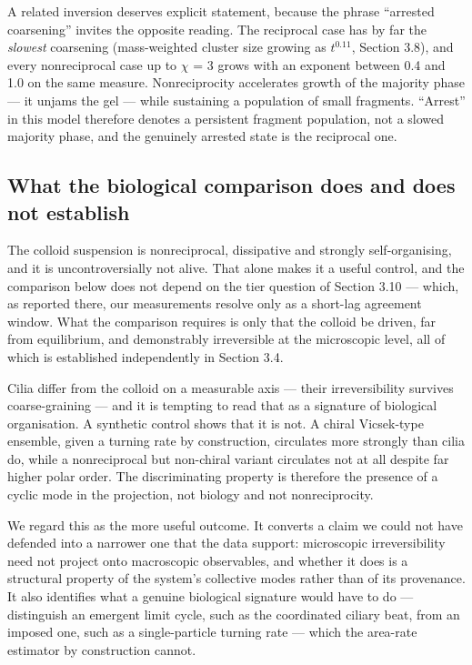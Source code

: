 \documentclass[aps,pre,preprint,superscriptaddress,nofootinbib,longbibliography]{revtex4-2}
\begin{document}
A related inversion deserves explicit statement, because the phrase ``arrested coarsening'' invites the opposite reading. The reciprocal case has by far the \emph{slowest} coarsening (mass-weighted cluster size growing as $t^{0.11}$, Section 3.8), and every nonreciprocal case up to $\chi$ = 3 grows with an exponent between 0.4 and 1.0 on the same measure. Nonreciprocity accelerates growth of the majority phase --- it unjams the gel --- while sustaining a population of small fragments. ``Arrest'' in this model therefore denotes a persistent fragment population, not a slowed majority phase, and the genuinely arrested state is the reciprocal one.

\subsection{What the biological comparison does and does not establish}

The colloid suspension is nonreciprocal, dissipative and strongly self-organising, and it is uncontroversially not alive. That alone makes it a useful control, and the comparison below does not depend on the tier question of Section 3.10 --- which, as reported there, our measurements resolve only as a short-lag agreement window. What the comparison requires is only that the colloid be driven, far from equilibrium, and demonstrably irreversible at the microscopic level, all of which is established independently in Section 3.4.

Cilia differ from the colloid on a measurable axis --- their irreversibility survives coarse-graining --- and it is tempting to read that as a signature of biological organisation. A synthetic control shows that it is not. A chiral Vicsek-type ensemble, given a turning rate by construction, circulates more strongly than cilia do, while a nonreciprocal but non-chiral variant circulates not at all despite far higher polar order. The discriminating property is therefore the presence of a cyclic mode in the projection, not biology and not nonreciprocity.

We regard this as the more useful outcome. It converts a claim we could not have defended into a narrower one that the data support: microscopic irreversibility need not project onto macroscopic observables, and whether it does is a structural property of the system's collective modes rather than of its provenance. It also identifies what a genuine biological signature would have to do --- distinguish an emergent limit cycle, such as the coordinated ciliary beat, from an imposed one, such as a single-particle turning rate --- which the area-rate estimator by construction cannot.
\end{document}
